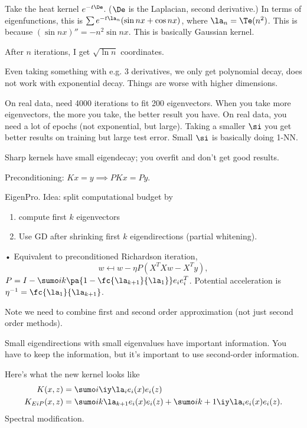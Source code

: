 Take the heat kernel $e^{-t\De}$. ($\De$ is the Laplacian, second derivative.) In terms of eigenfunctions, this is $\sum e^{-t\la_n} (\sin nx + \cos nx)$, where $\la_n= \Te(n^2)$. This is because $(\sin nx)'' = - n^2 \sin nx$. %
This is basically Gaussian kernel.

After $n$ iterations, I get $\sqrt{\ln n}$ coordinates.


Even taking something with e.g. 3 derivatives, we only get polynomial decay, does not work with exponential decay. Things are worse with higher dimensions.

On real data, need 4000 iterations to fit 200 eigenvectors.
When you take more eigenvectors, the more you take, the better result you have.
On real data, you need a lot of epochs (not exponential, but large). Taking a smaller $\si$ you get better results on training but large test error. Small $\si$ is basically doing 1-NN.

Sharp kernels have small eigendecay; you overfit and don't get good results.

Preconditioning: $Kx=y\implies PKx = Py$.

EigenPro. Idea: split computational budget by 
\begin{enumerate}
\item
compute first $k$ eigenvectors
\item
Use GD after shrinking first $k$ eigendirections (partial whitening).
\end{enumerate}•
Equivalent to preconditioned Richardson iteration,
$$
w\mapsfrom w-\eta P(X^TX w - X^T y),
$$
$P=I-\sumo ik \pa{1-\fc{\la_{k+1}}{\la_1}}e_ie_i^T$. Potential acceleration is $\eta^{-1} = \fc{\la_1}{\la_{k+1}}$. 

Note we need to combine first and second order approximation (not just second order methods).

Small eigendirections with small eigenvalues have important information. You have to keep the information, but it's important to use second-order information.

Here's what the new kernel looks like
\begin{align}
K(x,z) &= \sumo i\iy \la_ie_i(x)e_i(z)\\
K_{EiP}(x,z) &= \sumo ik \la_{k+1}e_i(x)e_i(z) + \sumo i{k+1}\iy \la_i e_i(x)e_i(z).
\end{align}
Spectral modification.

